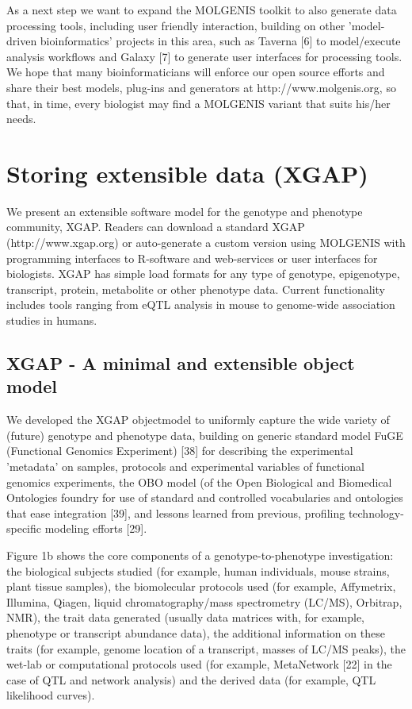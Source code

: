 As a next step we want to expand the MOLGENIS toolkit to also generate data processing tools, 
including user friendly interaction, building on other 'model-driven bioinformatics' projects 
in this area, such as Taverna [6] to model/execute analysis workflows and Galaxy [7] to generate 
user interfaces for processing tools. We hope that many bioinformaticians will enforce our open 
source efforts and share their best models, plug-ins and generators at http://www.molgenis.org, 
so that, in time, every biologist may find a MOLGENIS variant that suits his/her needs.

\section{Storing extensible data (XGAP)}
We present an extensible software model for the genotype and phenotype community, XGAP. Readers 
can download a standard XGAP (http://www.xgap.org) or auto-generate a custom version using 
MOLGENIS with programming interfaces to R-software and web-services or user interfaces for 
biologists. XGAP has simple load formats for any type of genotype, epigenotype, transcript, 
protein, metabolite or other phenotype data. Current functionality includes tools ranging 
from eQTL analysis in mouse to genome-wide association studies in humans.

\subsection{XGAP - A minimal and extensible object model}
We developed the XGAP objectmodel to uniformly capture the wide variety of (future) genotype 
and phenotype data, building on generic standard model FuGE (Functional Genomics Experiment) 
[38] for describing the experimental 'metadata' on samples, protocols and experimental variables 
of functional genomics experiments, the OBO model (of the Open Biological and Biomedical 
Ontologies foundry for use of standard and controlled vocabularies and ontologies that ease 
integration [39], and lessons learned from previous, profiling technology-specific modeling efforts [29].

Figure 1b shows the core components of a genotype-to-phenotype investigation: the biological 
subjects studied (for example, human individuals, mouse strains, plant tissue samples), the 
biomolecular protocols used (for example, Affymetrix, Illumina, Qiagen, liquid 
chromatography/mass spectrometry (LC/MS), Orbitrap, NMR), the trait data generated (usually 
data matrices with, for example, phenotype or transcript abundance data), the additional 
information on these traits (for example, genome location of a transcript, masses of LC/MS peaks), 
the wet-lab or computational protocols used (for example, MetaNetwork [22] in the case of QTL and
network analysis) and the derived data (for example, QTL likelihood curves).

